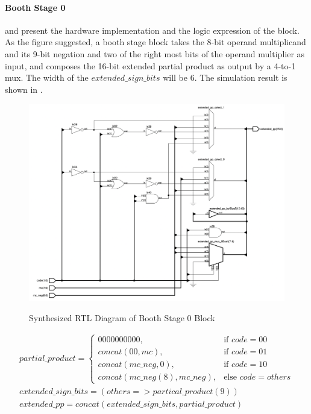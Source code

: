 \paragraph{Booth Stage 0}
 and  present the hardware implementation and the logic expression of the block.
As the figure suggested, a booth stage block takes the 8-bit operand multiplicand and its 9-bit negation and two of the right most bits of the operand multiplier
as input, and composes the 16-bit extended partial product as output by a 4-to-1 mux. The width of the \(extended\_sign\_bits\) will be 6.
The simulation result is shown in .

\begin{figure}[!ht]
	\centering
	\caption{Synthesized RTL Diagram of Booth Stage 0 Block}
	\includegraphics[width=\textwidth]{../img/booth_stage_0_rtl.png}
	\label{fig:booth_stage_0_rtl}
\end{figure}

\clearpage

\begin{equation}
	\begin{array}{c}
		partial\_product =
		\begin{cases}
			0000000000,                 & \text{if } code = 00       \\
			concat(00, mc),             & \text{if } code = 01       \\
			concat(mc\_neg, 0),         & \text{if } code = 10       \\
			concat(mc\_neg(8),mc\_neg), & \text{else } code = others
		\end{cases} \\
		extended\_sign\_bits = (others => partical\_product(9))  \\
		extended\_pp = concat(extended\_sign\_bits, partial\_product)
	\end{array}
	\label{exp:booth_stage_0}
\end{equation}

